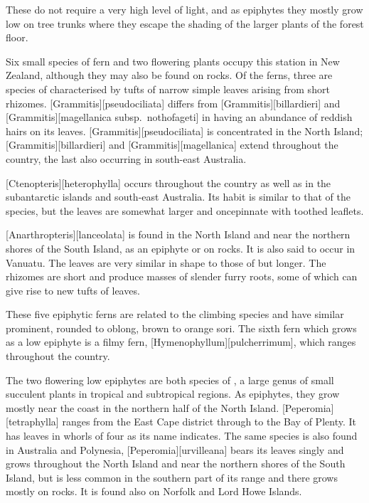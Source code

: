 These do not require a very high level of light, and as epiphytes they mostly grow low on tree trunks where they escape the shading of the larger plants of the forest floor.

Six small species of fern and two flowering plants occupy this station in New Zealand, although they may also be found on rocks.
Of the ferns, three are species of  characterised by tufts of narrow simple leaves arising from short rhizomes. [Grammitis][pseudociliata] differs from [Grammitis][billardieri] and [Grammitis][magellanica subsp.\ nothofageti] in having an abundance of reddish hairs on its leaves. [Grammitis][pseudociliata] is concentrated in the North Island; [Grammitis][billardieri] and [Grammitis][magellanica] extend throughout the country, the last also occurring in south-east Australia.

[Ctenopteris][heterophylla] occurs throughout the country as well as in the subantarctic islands and south-east Australia.
Its habit is similar to that of the  species, but the leaves are somewhat larger and oncepinnate with toothed leaflets.

[Anarthropteris][lanceolata] is found in the North Island and near the northern shores of the South Island, as an epiphyte or on rocks.
It is also said to occur in Vanuatu.
The leaves are very similar in shape to those of  but longer.
The rhizomes are short and produce masses of slender furry roots, some of which can give rise to new tufts of leaves.

These five epiphytic ferns are related to the climbing  species and have similar prominent, rounded to oblong, brown to orange sori.
The sixth fern which grows as a low epiphyte is a filmy fern, [Hymenophyllum][pulcherrimum], which ranges throughout the country.

The two flowering low epiphytes are both species of , a large genus of small succulent plants in tropical and subtropical regions.
As epiphytes, they grow mostly near the coast in the northern half of the North Island. [Peperomia][tetraphylla] ranges from the East Cape district through to the Bay of Plenty.
It has leaves in whorls of four as its name indicates.
The same species is also found in Australia and Polynesia, [Peperomia][urvilleana] bears its leaves singly and grows throughout the North Island and near the northern shores of the South Island, but is less common in the southern part of its range and there grows mostly on rocks.
It is found also on Norfolk and Lord Howe Islands.

